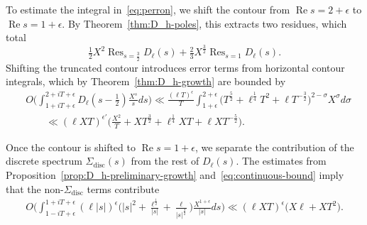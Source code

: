 \documentclass[11pt,reqno]{amsart}
\theoremstyle{plain}
\theoremstyle{definition}
\numberwithin{equation}{section}
\renewcommand{\Re}{\operatorname{Re}}
\DeclareMathOperator*{\Res}{Res}
\begin{document}
To estimate the integral in~\eqref{eq:perron}, we shift the contour from $\Re s = 2+\epsilon$ to $\Re s = 1+\epsilon$. By Theorem~\ref{thm:D_h-poles}, this extracts two residues, which total
\[
	\tfrac{1}{2} X^2 \Res_{s=\frac{3}{2}} D_\ell(s)
	+ \tfrac{2}{3} X^\frac{3}{2} \Res_{s=1} D_\ell(s).
\]
Shifting the truncated contour introduces error terms from horizontal contour integrals, which by Theorem~\ref{thm:D_h-growth} are bounded by
\begin{align*}
	& O\Big(
	\int_{1+i T+\epsilon}^{2+i T + \epsilon} \!\!
	D_\ell(s-\tfrac{1}{2}) \frac{X^s}{s} ds
	\Big)
	\ll
	\frac{(\ell T)^\epsilon}{T} \!
	\int_{1+\epsilon}^{2+ \epsilon} \!
	\big(T^{\frac{5}{2}} + \ell^\frac{1}{4} T^{2} + \ell T^{-\frac{3}{2}} \big)^{2-\sigma} 
		X^{\sigma} d \sigma \\
	& \qquad \ll (\ell XT)^{\epsilon'}\Big(\frac{X^2}{T} + X T^{\frac{3}{2}} 
			+ \ell^{\frac{1}{4}} X T + \ell  X T^{-\frac{5}{2}}  \Big).
\end{align*}

Once the contour is shifted to $\Re s = 1 + \epsilon$, we separate the contribution of the discrete spectrum $\Sigma_{\mathrm{disc}}(s)$ from the rest of $D_\ell(s)$. The estimates from Proposition~\ref{prop:D_h-preliminary-growth} and~\eqref{eq:continuous-bound} imply that the non-$\Sigma_{\mathrm{disc}}$ terms contribute
\begin{align*}
	O\Big(\int_{1-iT+\epsilon}^{1+iT+\epsilon} (\ell \vert s \vert)^\epsilon 
		\Big(  \vert s \vert^2 
			 +  \frac{\ell^{\frac{1}{2}}}{\vert s \vert} 
			 + \frac{\ell}{\vert s \vert^{\frac{3}{2}}} \Big) 
			\frac{X^{1+\epsilon}}{\vert s \vert} ds \! \Big) 
	\ll (\ell X T)^\epsilon \big( X \ell   + X T^2 \big).
\end{align*}
\end{document}
